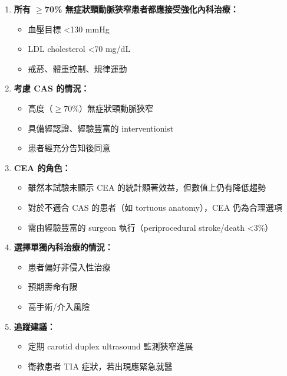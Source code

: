 \documentclass[12pt,a4paper]{article}
\begin{document}
\begin{tcolorbox}[colback=emergency_blue!5!white,colframe=emergency_blue,title=\textbf{臨床建議}]
\begin{enumerate}
    \item \textbf{所有 $\geq$70\% 無症狀頸動脈狹窄患者都應接受強化內科治療：}
    \begin{itemize}
        \item 血壓目標 <130 mmHg
        \item LDL cholesterol <70 mg/dL
        \item 戒菸、體重控制、規律運動
    \end{itemize}

    \item \textbf{考慮 CAS 的情況：}
    \begin{itemize}
        \item 高度（$\geq$70\%）無症狀頸動脈狹窄
        \item 具備經認證、經驗豐富的 interventionist
        \item 患者經充分告知後同意
    \end{itemize}

    \item \textbf{CEA 的角色：}
    \begin{itemize}
        \item 雖然本試驗未顯示 CEA 的統計顯著效益，但數值上仍有降低趨勢
        \item 對於不適合 CAS 的患者（如 tortuous anatomy），CEA 仍為合理選項
        \item 需由經驗豐富的 surgeon 執行（periprocedural stroke/death <3\%）
    \end{itemize}

    \item \textbf{選擇單獨內科治療的情況：}
    \begin{itemize}
        \item 患者偏好非侵入性治療
        \item 預期壽命有限
        \item 高手術/介入風險
    \end{itemize}

    \item \textbf{追蹤建議：}
    \begin{itemize}
        \item 定期 carotid duplex ultrasound 監測狹窄進展
        \item 衛教患者 TIA 症狀，若出現應緊急就醫
    \end{itemize}
\end{enumerate}
\end{tcolorbox}
\end{document}
